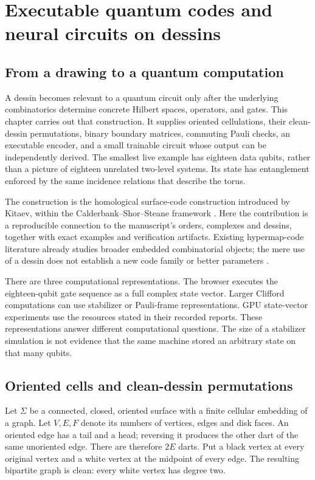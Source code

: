 \chapter{Executable quantum codes and neural circuits on dessins}
\label{ch:quantum-surfaces}

\section{From a drawing to a quantum computation}

A dessin becomes relevant to a quantum circuit only after the underlying
combinatorics determine concrete Hilbert spaces, operators, and gates.  This
chapter carries out that construction.  It supplies oriented cellulations,
their clean-dessin permutations, binary boundary matrices, commuting Pauli
checks, an executable encoder, and a small trainable circuit whose output
can be independently derived.  The smallest live example has eighteen
data qubits, rather than a picture of eighteen unrelated two-level systems.
Its state has entanglement enforced by the same incidence relations that
describe the torus.

The construction is the homological surface-code construction introduced
by Kitaev, within the Calderbank--Shor--Steane framework
\cite{QSKitaev2003,QSCalderbankShor1996,QSSteane1996}.  Here the contribution
is a reproducible connection to the manuscript's orders, complexes and
dessins, together with exact examples and verification artifacts.  Existing
hypermap-code literature already studies broader embedded combinatorial
objects; the mere use of a dessin does not establish a new code family or
better parameters \cite{QSLeslie2013,QSSarvepalli2014}.

There are three computational representations.  The browser executes the
eighteen-qubit gate sequence as a full complex state vector.  Larger
Clifford computations can use stabilizer or Pauli-frame representations.
GPU state-vector experiments use the resources stated in their recorded
reports.  These representations answer different computational questions.
The size of a stabilizer simulation is not evidence that the same machine
stored an arbitrary state on that many qubits.

\section{Oriented cells and clean-dessin permutations}

Let $\Sigma$ be a connected, closed, oriented surface with a finite cellular
embedding of a graph.  Let $V,E,F$ denote its numbers of vertices, edges
and disk faces.  An oriented edge has a tail and a head; reversing it
produces the other dart of the same unoriented edge.  There are therefore
$2E$ darts.  Put a black vertex at every original vertex and a white vertex
at the midpoint of every edge.  The resulting bipartite graph is clean:
every white vertex has degree two.

